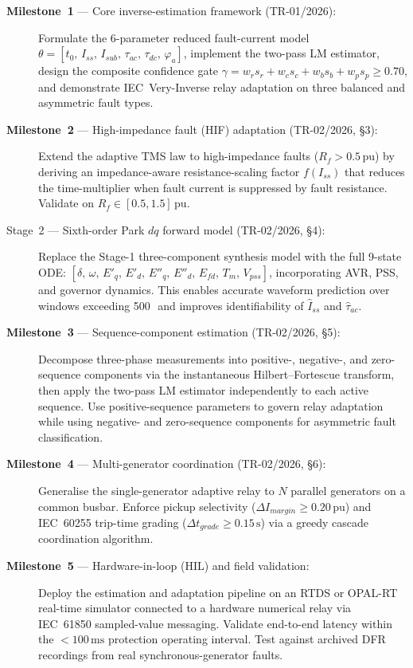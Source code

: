 \documentclass[12pt,a4paper]{article}
\newcommand{\milestone}[1]{\textbf{Milestone~#1}}
\newcommand{\pu}{\,\text{pu}}
\newcommand{\mss}{\,\text{ms}}
\newcommand{\sss}{\,\text{s}}
\begin{document}
\begin{description}
  \item[\milestone{1} --- Core inverse-estimation framework (TR-01/2026):]
        Formulate the 6-parameter reduced fault-current model
        $\theta = [t_0,\, I_{ss},\, I_{sub},\, \tau_{ac},\, \tau_{dc},\, \varphi_a]$,
        implement the two-pass LM estimator, design the composite confidence
        gate $\gamma = w_r s_r + w_c s_c + w_b s_b + w_p s_p \geq 0.70$,
        and demonstrate IEC~Very-Inverse relay adaptation on three balanced
        and asymmetric fault types.

  \item[\milestone{2} --- High-impedance fault (HIF) adaptation (TR-02/2026,
        \S3):]
        Extend the adaptive TMS law to high-impedance faults ($R_f > 0.5\pu$)
        by deriving an impedance-aware resistance-scaling factor $f(I_{ss})$
        that reduces the time-multiplier when fault current is suppressed by
        fault resistance.  Validate on $R_f \in [0.5, 1.5]\pu$.

  \item[Stage~2 --- Sixth-order Park $dq$ forward model (TR-02/2026, \S4):]
        Replace the Stage-1 three-component synthesis model with the full
        9-state ODE:
        $[\delta,\, \omega,\, E'_q,\, E'_d,\, E''_q,\, E''_d,\, E_{fd},\,
        T_m,\, V_{pss}]$, incorporating AVR, PSS, and governor dynamics.
        This enables accurate waveform prediction over windows exceeding
        500\mss\ and improves identifiability of $\hat{I}_{ss}$ and
        $\hat{\tau}_{ac}$.

  \item[\milestone{3} --- Sequence-component estimation (TR-02/2026, \S5):]
        Decompose three-phase measurements into positive-, negative-, and
        zero-sequence components via the instantaneous Hilbert--Fortescue
        transform, then apply the two-pass LM estimator independently to
        each active sequence.  Use positive-sequence parameters to govern
        relay adaptation while using negative- and zero-sequence components
        for asymmetric fault classification.

  \item[\milestone{4} --- Multi-generator coordination (TR-02/2026, \S6):]
        Generalise the single-generator adaptive relay to $N$ parallel
        generators on a common busbar.  Enforce pickup selectivity
        ($\Delta I_{margin} \geq 0.20\pu$) and IEC~60255 trip-time grading
        ($\Delta t_{grade} \geq 0.15\sss$) via a greedy cascade coordination
        algorithm.

  \item[\milestone{5} --- Hardware-in-loop (HIL) and field validation:]
        Deploy the estimation and adaptation pipeline on an RTDS or OPAL-RT
        real-time simulator connected to a hardware numerical relay via
        IEC~61850 sampled-value messaging.  Validate end-to-end latency
        within the $<100\mss$ protection operating interval.  Test against
        archived DFR recordings from real synchronous-generator faults.
\end{description}
\end{document}
